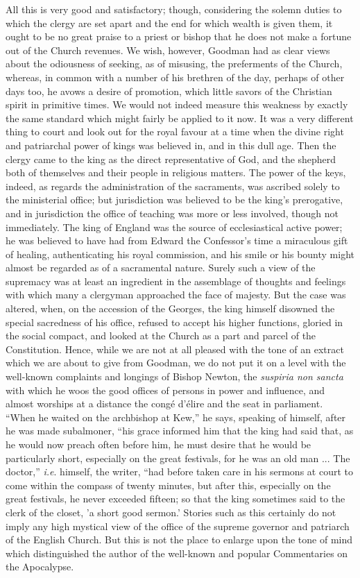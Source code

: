 All this is very good and satisfactory; though,
considering the solemn duties to which the clergy are set apart and the
end for which wealth is given them, it ought to be no great praise to a
priest or bishop that he does not make a fortune out of the Church
revenues. We wish, however, Goodman had as clear views about the
odiousness of seeking, as of misusing, the preferments of the Church,
whereas, in common with a number of his brethren of the day, perhaps of
other days too, he avows a desire of promotion, which little savors of
the Christian spirit in primitive times. We would not indeed measure
this weakness by exactly the same standard which might fairly be applied
to it now. It was a very different thing to court and look out for the
royal favour at a time when the divine right and patriarchal power of
kings was believed in, and in this dull age. Then the clergy came to the
king as the direct representative of God, and the shepherd both of
themselves and their people in religious matters. The power of the keys,
indeed, as regards the administration of the sacraments, was ascribed
solely to the ministerial office; but jurisdiction was believed to be
the king's prerogative, and in jurisdiction the office of teaching was
more or less involved, though not immediately. The king of England was
the source of ecclesiastical active power; he was believed to have had
from Edward the Confessor's time a miraculous gift of healing,
authenticating his royal commission, and his smile or his bounty
might almost be regarded as of a sacramental nature. Surely such a view
of the supremacy was at least an ingredient in the assemblage of
thoughts and feelings with which many a clergyman approached the face of
majesty. But the case was altered, when, on the accession of the
Georges, the king himself disowned the special sacredness of his office,
refused to accept his higher functions, gloried in the social compact,
and looked at the Church as a part and parcel of the Constitution.
Hence, while we are not at all pleased with the tone of an extract which
we are about to give from Goodman, we do not put it on a level with the
well-known complaints and longings of Bishop Newton, the \emph{suspiria non
sancta} with which he woos the good offices of persons in power and
influence, and almost worships at a distance the congé d'élire and the
seat in parliament. ``When he waited on the archbishop at Kew,'' he says,
speaking of himself, after he was made subalmoner, ``his grace informed
him that the king had said that, as he would now preach often before
him, he must desire that he would be particularly short, especially on
the great festivals, for he was an old man ... The doctor,'' \emph{i.e}.
himself, the writer, ``had before taken care in his sermons at court to
come within the compass of twenty minutes, but after this, especially on
the great festivals, he never exceeded fifteen; so that the king
sometimes said to the clerk of the closet, 'a short good sermon.'
Stories such as this certainly do not imply any high mystical view of
the office of the supreme governor and patriarch of the English Church.
But this is not the place to enlarge upon the tone of mind which
distinguished the author of the well-known and popular Commentaries on
the Apocalypse.

